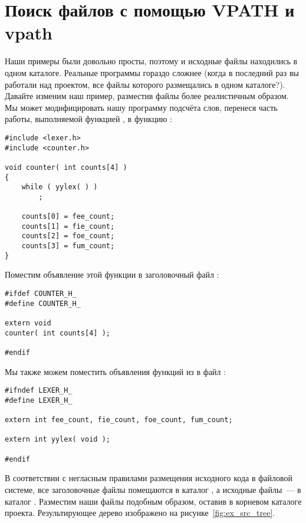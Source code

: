 \section{Поиск файлов с помощью VPATH и vpath}
\label{sec:vpath}

Наши примеры были довольно просты, поэтому \Makefile{} и исходные
файлы находились в одном каталоге. Реальные программы гораздо сложнее
(когда в последний раз вы работали над проектом, все файлы которого
размещались в одном каталоге?). Давайте изменим наш пример, разместив
файлы более реалистичным образом. Мы может модифицировать нашу
программу подсчёта слов, перенеся часть работы, выполняемой функцией
, в функцию :

{\footnotesize
\begin{verbatim}
#include <lexer.h>
#include <counter.h>

void counter( int counts[4] )
{
    while ( yylex( ) )
        ;

    counts[0] = fee_count;
    counts[1] = fie_count;
    counts[2] = foe_count;
    counts[3] = fum_count;
}
\end{verbatim}
}

Поместим объявление этой функции в заголовочный файл
:

{\footnotesize
\begin{verbatim}
#ifdef COUNTER_H_
#define COUNTER_H_

extern void
counter( int counts[4] );

#endif
\end{verbatim}
}

Мы также можем поместить объявления функций из  в
файл :

{\footnotesize
\begin{verbatim}
#ifndef LEXER_H_
#define LEXER_H_

extern int fee_count, fie_count, foe_count, fum_count;

extern int yylex( void );

#endif
\end{verbatim}
}

В соответствии с негласным правилами размещения исходного кода в
файловой системе, все заголовочные файлы помещаются в каталог
, а исходные файлы~--- в каталог .
Разместим наши файлы подобным образом, оставив \Makefile{} в корневом
каталоге проекта. Результирующее дерево изображено на
рисунке~\ref{fig:ex_src_tree}.

